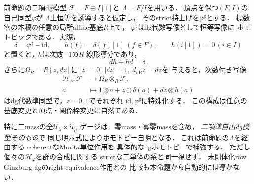 \begin{proposition}[有限関係表示のkernelの明示的dgホモトピー]
\label{prop:qa-q12-mass-dg-polynomial-nullhomotopy}
前命題の二項dg模型
$\mathscr F=F\oplus I[1]$と
$\Lambda=F/I$を用いる．
頂点を保つ$(F,I)$の自己同型$\varphi$が
$\Lambda$上恒等を誘導すると仮定し，
そのstrict持上げを$\varphi^\sharp$とする．
標数零の本稿の任意の局所affine基底$R$上で，
$\varphi^\sharp$はdg代数写像として恒等写像に
ホモトピックである．実際，
\[
 \delta=\varphi^\sharp-\mathrm{id},\qquad
 h(f)=\delta(f)[1]\ (f\in F),\qquad
 h(i[1])=0\ (i\in I)
 \tag{DH}\label{eq:qa-q12-mass-dg-homotopy-derivation}
\]
と置くと，$h$は次数$-1$の$R$-線形導分であり，
\[
             dh+hd=\delta .
 \tag{CH}\label{eq:qa-q12-mass-dg-chain-homotopy}
\]
さらに$\Omega_R=R[z,dz]$に
$|z|=0,\ |dz|=1,\ d_{\mathrm{dR}}z=dz$を
与えると，次数付き写像
\[
 \begin{split}
 \mathscr H_\varphi:\mathscr F
      &\longrightarrow\Omega_R\otimes_R\mathscr F,\\
 a&\longmapsto 1\otimes a+z\otimes\delta(a)
                     +dz\otimes h(a)
 \end{split}
 \tag{AH}\label{eq:qa-q12-mass-dg-a1-homotopy}
\]
はdg代数準同型で，$z=0,1$でそれぞれ
$\mathrm{id},\varphi^\sharp$に特殊化する．
この構成は任意の基底変更と頂点・関係枠変更に自然である．

特に二massの全$\mathcal U_\lambda\times\mathcal U_\mu$
ゲージは，零mass・冪零massを含め，
\emph{二項準自由dg模型そのもの}で
同じ明示式によりホモトピー自明となる．
これは前命題の$\Lambda$を経由する
coherentなMorita単位作用を
具体的なdgホモトピーで補強する．
ただし個々の$\mathscr H_\varphi$を群の合成に関する
strictな二単体の系と同一視せず，
未剛体化raw Ginzburg dgのright-equivalence作用との
比較も本命題から自動的には導かない．
\end{proposition}
